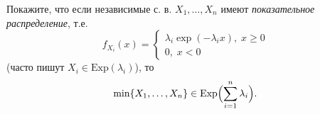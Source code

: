 \begin{comment}
\begin{problem}[рекорды]
Пусть $X_1 ,X_2 ,\ldots $ - независимые 
случайные величины с одной и той же плотностью распределения вероятностей 
$p(x)$. Будем говорить, что наблюдается рекордное значение в момент времени 
n$>$1, если $X_n >\max \left[ {X_1 ,...,X_{n-1} } \right]$. Докажите 
следующие утверждения.

\begin{enumerate}
\item Вероятность того, что рекорд зафиксирован в момент времени $n$, 
равна $1/n$.

\item Математическое ожидание числа рекордов до момента времени $n$ 
равно 
\[
\sum\limits_{1<i\le n} {\frac{1}{i}} \sim \ln n.
\]

\item Пусть $Y_n $ --- случайная величина, принимающая значение $1$, если 
в момент времени $n$ зафиксирован рекорд, и значение $0$ -- в противном случае. 
Тогда случайные величины $Y_1 ,Y_2 ,\ldots$ независимы в совокупности.

\item Дисперсия числа рекордов до момента времени $n$ равна
\[
\sum\limits_{1<i\le n} {\frac{i-1}{i^2}} \sim \ln n.
\]

\item Если $T$ -- момент появления первого рекорда после момента времени $1$, то $ET=\infty $.
\end{enumerate}
\end{problem}

\end{comment}

\begin{problem}
Покажите, что если независимые с. в. $X_1,\dots,X_n$ имеют   
\textit{показательное распределение}, т.е. 
$$
f_{X_i}(x)=\begin{cases}
\lambda_i\exp(-\lambda_i x), \; x\geqslant 0 \\
0,\; x<0
\end{cases}
$$
(часто пишут $X_i\in \mathrm{Exp}(\lambda_i)$), то 
$$
\min\{ X_1,\ldots, X_n\}\in \mathrm{Exp}\Bigl( \sum\limits_{i=1}^{n}\lambda_i\Bigr) . 
$$
\end{problem}

